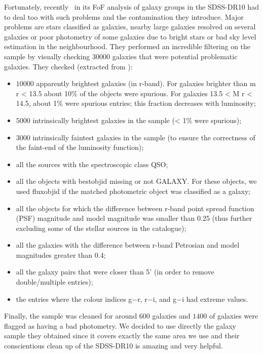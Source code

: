Fortunately, recently~\cite{Tempel+14} in its FoF analysis of galaxy groups in
the SDSS-DR10 had to deal too with such problems and the contamination they
introduce. Major problems are stars classified as galaxies, nearby large
galaxies resolved on several galaxies or poor photometry of some galaxies due
to bright stars or bad sky level estimation in the neighbourhood. They
performed an incredible filtering on the sample by visually checking 30000
galaxies that were potential problematic galaxies. They checked (extracted from
\cite{Tempel+14}):
%
\begin{itemize}
    \item $10000$ apparently brightest galaxies (in r-band). For galaxies
        brighter than m r < 13.5 about 10\% of the objects were spurious. For
        galaxies 13.5 < M r < 14.5, about 1\% were spurious entries; this
        fraction decreases with luminosity;
    \item $5000$ intrinsically brightest galaxies in the sample (< 1\% were
        spurious);
    \item $3000$ intrinsically faintest galaxies in the sample (to ensure the
        correctness of the faint-end of the luminosity function);
    \item all the sources with the spectroscopic class QSO\@;
    \item all the objects with bestobjid missing or not GALAXY\@. For these
        objects, we used fluxobjid if the matched photometric object was
        classified as a galaxy;
    \item all the objects for which the difference between r-band point spread
        function (PSF) magnitude and model magnitude was smaller than 0.25
        (thus further excluding some of the stellar sources in the catalogue);
    \item all the galaxies with the difference between r-band Petrosian and
        model magnitudes greater than 0.4;
    \item all the galaxy pairs that were closer than 5' (in order to remove
        double/multiple entries);
    \item the entries where the colour indices g−r, r−i, and g−i had extreme
        values.
\end{itemize}

Finally, the sample was cleaned for around $600$ galaxies and $1400$ of
galaxies were flagged as having a bad photometry. We decided to use directly
the galaxy sample they obtained since it covers exactly the same area we use
and their conscientious clean up of the SDSS-DR10 is amazing and very helpful.

